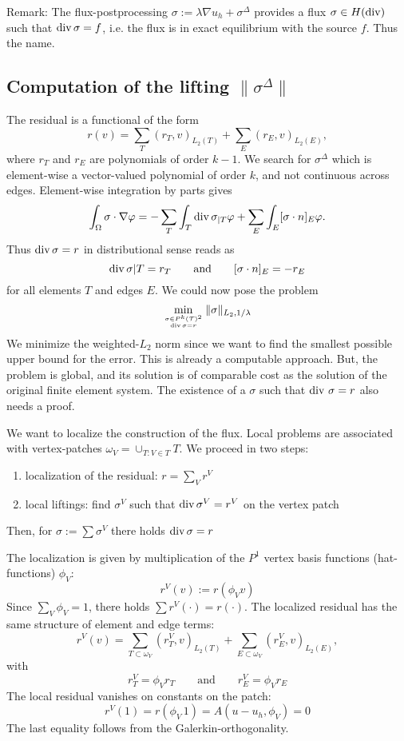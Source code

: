Remark: The flux-postprocessing $\sigma := \lambda \nabla u_h + \sigma^\Delta$ provides a flux $\sigma \in H(\operatorname{div})$ such that $\operatorname{div} \sigma = f$, i.e. the flux is in exact equilibrium with the source $f$. Thus the name.

\subsection{Computation of the lifting $\| \sigma^\Delta \|$}

The residual is a functional of the form
$$
r(v) = \sum_T (r_T, v)_{L_2(T)} + \sum_E (r_E, v)_{L_2(E)},
$$
where $r_T$ and $r_E$ are polynomials of order $k-1$. We search for $\sigma^\Delta$ which is element-wise a vector-valued polynomial of order $k$, and not continuous across edges. Element-wise integration by parts gives
$$
\int_\Omega \sigma \cdot \nabla \varphi = -\sum_T \int_T \operatorname{div} \sigma_{|T} \varphi + \sum_E \int_E [\sigma \cdot n]_E \varphi.
$$
Thus $\operatorname{div} \sigma = r$ in distributional sense reads as
$$
\operatorname{div} \sigma{|T} = r_T \qquad \text{and} \qquad [\sigma \cdot n]_E = -r_E
$$
for all elements $T$ and edges $E$. We could now pose the problem 
$$
\min_{ \sigma \in P^k({\mathcal T})^2 \atop \operatorname{div} \sigma = r} \| \sigma \|_{L_2, 1/\lambda}
$$
We minimize the weighted-$L_2$ norm since we want to find the smallest possible upper bound for the error. This is already a computable approach. 
But, the problem is global, and its solution is of comparable cost as the solution of the original finite element system.  The existence of a $\sigma$ such that $\operatorname{div} \, \sigma = r$ also needs a proof.

We want to localize the construction of the flux. Local problems are associated with vertex-patches $\omega_V = \cup_{T : V \in T} T$. We proceed in two steps:
\begin{enumerate}
\item localization of the residual: $r = \sum_V r^V$
\item local liftings: find $\sigma^V$ such that $\operatorname{div} \sigma^V = r^V$ on the vertex patch
\end{enumerate}
Then, for $\sigma := \sum \sigma^V$ there holds $\operatorname{div} \sigma = r$

The localization is given by multiplication of the $P^1$ vertex basis functions (hat-functions) $\phi_V$:
$$
r^V(v) := r( \phi_V v)
$$
Since $\sum_V \phi_V = 1$, there holds $\sum r^V(\cdot) = r(\cdot)$. The localized residual has the same structure of element and edge terms:
$$
r^V(v) = \sum_{T \subset \omega_V} (r_T^V, v)_{L_2(T)} + \sum_{E \subset \omega_V} (r_E^V, v)_{L_2(E)},
$$
with 
$$
r_T^V = \phi_V r_T \qquad \text{and} \qquad r_E^V = \phi_V r_E
$$
The local residual vanishes on constants on the patch:
$$
r^V(1) = r(\phi_V \, 1) = A(u-u_h, \phi_V) = 0
$$
The last equality follows from the Galerkin-orthogonality. 

